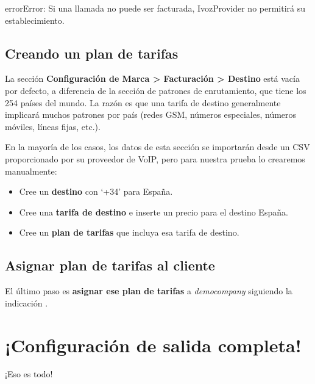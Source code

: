\documentclass[letterpaper,10pt,spanish]{sphinxmanual}
\begin{document}
\begin{notice}{error}{Error:}
Si una llamada no puede ser facturada, IvozProvider no permitirá su establecimiento.
\end{notice}


\subsection{Creando un plan de tarifas}
\label{getting_started/external_outgoing_calls/noplan_nocall:creating-a-rating-plan}
La sección \textbf{Configuración de Marca \textgreater{} Facturación \textgreater{} Destino} está vacía por defecto, a diferencia de la sección de patrones de enrutamiento, que tiene los 254 países del mundo. La razón es que una tarifa de destino generalmente implicará muchos patrones por país (redes GSM, números especiales, números móviles, líneas fijas, etc.).

En la mayoría de los casos, los datos de esta sección se importarán desde un CSV proporcionado por su proveedor de VoIP, pero para nuestra prueba lo crearemos manualmente:
\begin{itemize}
\item {} 
Cree un \textbf{destino} con `+34' para España.

\item {} 
Cree una \textbf{tarifa de destino} e inserte un precio para el destino España.

\item {} 
Cree un \textbf{plan de tarifas} que incluya esa tarifa de destino.

\end{itemize}


\subsection{Asignar plan de tarifas al cliente}
\label{getting_started/external_outgoing_calls/noplan_nocall:assign-rating-plan-to-client}
El último paso es \textbf{asignar ese plan de tarifas} a \emph{democompany} siguiendo la indicación {\hyperref[administration_portal/brand/billing/rating_plans:assigning\string-rating\string-plans\string-to\string-clients]{}}.


\section{¡Configuración de salida completa!}
\label{getting_started/external_outgoing_calls/finish:outgoing-configuration-complete}\label{getting_started/external_outgoing_calls/finish::doc}
¡Eso es todo!
\end{document}
